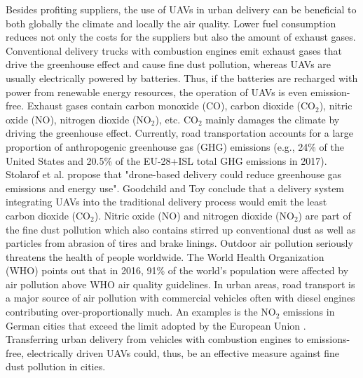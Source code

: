 Besides profiting suppliers,
the use of UAVs in urban delivery can be beneficial to both globally the climate and locally the air quality.
Lower fuel consumption reduces not only the costs for the suppliers but also the amount of exhaust gases.
Conventional delivery trucks with combustion engines emit exhaust gases that drive the greenhouse effect and cause fine dust pollution,
whereas UAVs are usually electrically powered by batteries.
Thus, if the batteries are recharged with power from renewable energy resources, the operation of UAVs is even emission-free.
Exhaust gases contain carbon monoxide ($\text{CO}$), carbon dioxide ($\text{CO}_2$), nitric oxide ($\text{NO}$), nitrogen dioxide ($\text{NO}_2$), etc.\cite{Deutschlandfunk2017}
$\text{CO}_2$ mainly damages the climate by driving the greenhouse effect.
Currently, road transportation accounts for a large proportion of anthropogenic greenhouse gas (GHG) emissions
(e.g., 24\% of the United States \cite{EPA2019} and 20.5\% of the EU-28+ISL \cite{EEA2019} total GHG emissions in 2017).
Stolarof et al. \cite{Stolaroff2018} propose that "drone-based delivery could reduce greenhouse gas emissions and energy use".
Goodchild and Toy \cite{Goodchild2018} conclude that a delivery system integrating UAVs into the traditional delivery process 
would emit the least carbon dioxide ($\text{CO}_2$).
Nitric oxide ($\text{NO}$) and nitrogen dioxide ($\text{NO}_2$) are part of the fine dust pollution
which also contains stirred up conventional dust as well as particles from abrasion of tires and brake linings.
Outdoor air pollution seriously threatens the health of people worldwide.
The World Health Organization (WHO) \cite{WHO2018} points out that in 2016, 
91\% of the world's population were affected by air pollution above WHO air quality guidelines. 
In urban areas, road transport is a major source of air pollution
with commercial vehicles often with diesel engines contributing over-proportionally much. \cite{Bouton2017} 
An examples is the $\text{NO}_2$ emissions in German cities that exceed the limit adopted by the European Union \cite{Wehrmann2019}.
Transferring urban delivery from vehicles with combustion engines to emissions-free, electrically driven UAVs could, thus, 
be an effective measure against fine dust pollution in cities.

